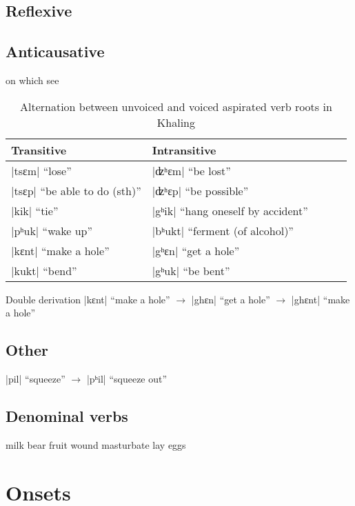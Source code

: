 \documentclass[oldfontcommands,oneside,a4paper,11pt]{article}
\newcommand{\ipa}[1]{{\phon\mbox{#1}}} %
\newcommand{\dhatu}[2]{|\ipa{#1}| ``#2''}
\begin{document}
\subsection{Reflexive}\label{sec:refl}

\subsection{Anticausative} \label{sec:anticaus}
\citet{jacques15derivational.khaling}

on which see \citealt{jacques15spontaneous, jacques15causative}

\begin{table}[H]
\caption{Alternation between unvoiced and voiced aspirated verb roots in Khaling} \centering \label{tab:anticaus}
\begin{tabular}{lllll}
\toprule
Transitive & Intransitive&  \\
\midrule
\dhatu{tsɛm}{lose} & \dhatu{ʣʰɛm}{be lost} \\
\dhatu{tsɛp}{be able to do (sth)} & \dhatu{ʣʰɛp}{be possible} \\
\dhatu{kik}{tie} & \dhatu{gʰik}{hang oneself by accident} \\
\dhatu{pʰuk}{wake up} & \dhatu{bʰukt}{ferment (of alcohol)} \\
\midrule
\dhatu{kɛnt}{make a hole} & \dhatu{gʰɛn}{get a hole} \\
\dhatu{kukt}{bend} & \dhatu{gʰuk}{be bent}\\
\bottomrule
\end{tabular}
\end{table}

Double derivation 
\dhatu{kɛnt}{make a hole} $\rightarrow$  \dhatu{ghɛn}{get a hole} $\rightarrow$  \dhatu{ghɛnt}{make a hole}

\subsection{Other}
\dhatu{pil}{squeeze} $\rightarrow$ \dhatu{pʰil}{squeeze out}

\subsection{Denominal verbs}
milk
bear fruit
wound
masturbate
lay eggs
\section{Onsets} \label{sec:onsets}
\end{document}

